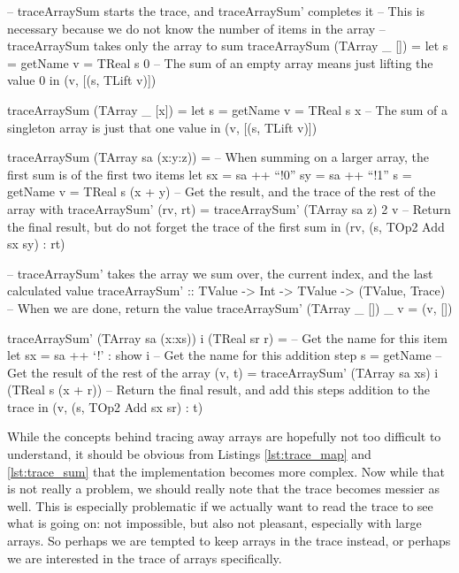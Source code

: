         \begin{haskell}[caption=Tracing the sum operator, label=lst:trace_sum, gobble=12]
            -- traceArraySum starts the trace, and traceArraySum' completes it
            -- This is necessary because we do not know the number of items in the array
            -- traceArraySum takes only the array to sum
            traceArraySum (TArray _ []) =
                let s = getName
                    v = TReal s 0
                -- The sum of an empty array means just lifting the value 0
                in  (v, [(s, TLift v)])

            traceArraySum (TArray _ [x]) =
                let s = getName
                    v = TReal s x
                -- The sum of a singleton array is just that one value
                in  (v, [(s, TLift v)])

            traceArraySum (TArray sa (x:y:z)) =
                -- When summing on a larger array, the first sum is of the first two items
                let sx = sa ++ ``!0''
                    sy = sa ++ ``!1''
                    s  = getName
                    v  = TReal s (x + y)
                    -- Get the result, and the trace of the rest of the array with traceArraySum'
                    (rv, rt) = traceArraySum' (TArray sa z) 2 v
                -- Return the final result, but do not forget the trace of the first sum
                in  (rv, (s, TOp2 Add sx sy) : rt)

            -- traceArraySum' takes the array we sum over, the current index, and the last calculated value
            traceArraySum' :: TValue -> Int -> TValue -> (TValue, Trace)
            -- When we are done, return the value
            traceArraySum' (TArray _ []) _ v = (v, [])
            
            traceArraySum' (TArray sa (x:xs)) i (TReal sr r) =
                -- Get the name for this item
                let sx = sa ++ `!' : show i
                    -- Get the name for this addition step
                    s  = getName
                    -- Get the result of the rest of the array
                    (v, t) = traceArraySum' (TArray sa xs) i (TReal s (x + r))
                -- Return the final result, and add this steps addition to the trace
                in  (v, (s, TOp2 Add sx sr) : t)
        \end{haskell}

        While the concepts behind tracing away arrays are hopefully not too difficult to understand, it should be obvious from Listings \ref{lst:trace_map} and \ref{lst:trace_sum} that the implementation becomes more complex.
        Now while that is not really a problem, we should really note that the trace becomes messier as well.
        This is especially problematic if we actually want to read the trace to see what is going on: not impossible, but also not pleasant, especially with large arrays.
        So perhaps we are tempted to keep arrays in the trace instead, or perhaps we are interested in the trace of arrays specifically.

